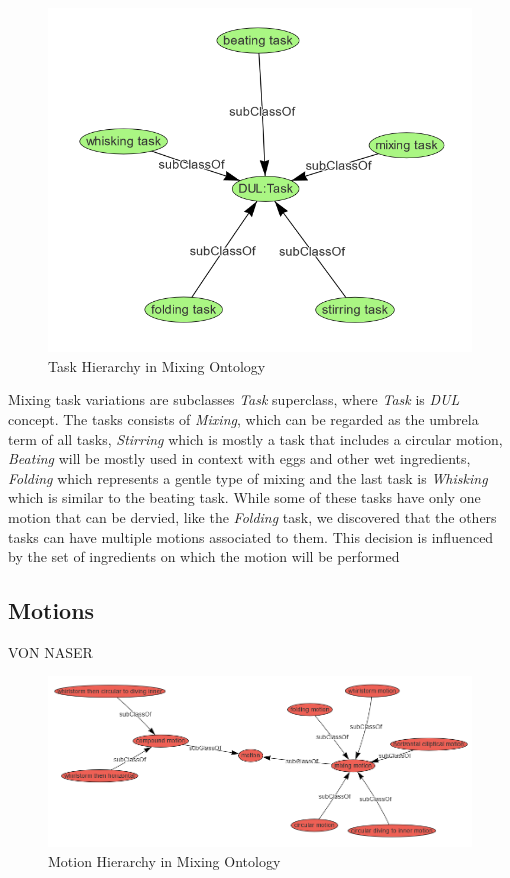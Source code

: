 \begin{figure}[H]
    \includegraphics[scale=0.45]{Graphics/classHierarchy/task_hierarchy.png}
    \centering
    \caption{Task Hierarchy in Mixing Ontology}
\end{figure}

Mixing task variations are subclasses \textit{Task} superclass, where \textit{Task} is \textit{DUL} concept. The tasks consists of \textit{Mixing}, which can be regarded as the umbrela term of all tasks, \textit{Stirring} which is mostly a task that includes a circular motion, \textit{Beating} will be mostly used in context with eggs and other wet ingredients, \textit{Folding} which represents a gentle type of mixing and the last task is \textit{Whisking} which is similar to the beating task.
While some of these tasks have only one motion that can be dervied, like the \textit{Folding} task, we discovered that the others tasks can have multiple motions associated to them. This decision is influenced by the set of ingredients on which the motion will be performed

\subsection{Motions}
VON NASER
\begin{figure}[H]
    \includegraphics[scale=0.45]{Graphics/classHierarchy/motions_hierarchy.png}
    \centering
    \caption{Motion Hierarchy in Mixing Ontology}
\end{figure}


